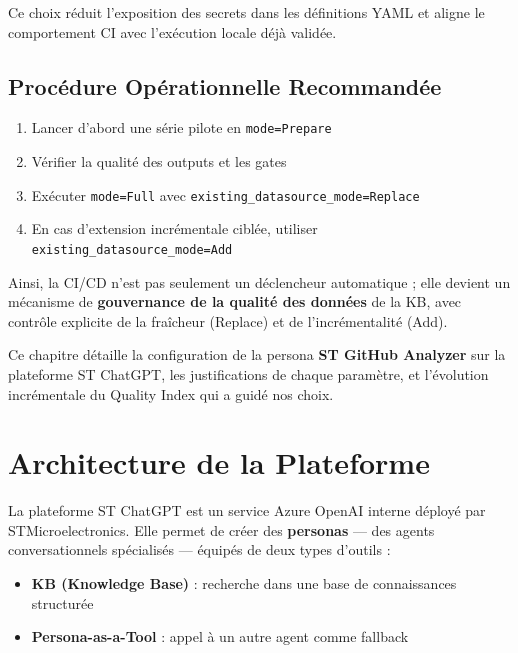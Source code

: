 \documentclass[12pt,a4paper]{report}
\begin{document}
Ce choix réduit l'exposition des secrets dans les définitions YAML et aligne le comportement CI avec l'exécution locale déjà validée.

\subsection{Procédure Opérationnelle Recommandée}

\begin{enumerate}
  \item Lancer d'abord une série pilote en \texttt{mode=Prepare}
  \item Vérifier la qualité des outputs et les gates
  \item Exécuter \texttt{mode=Full} avec \texttt{existing\_datasource\_mode=Replace}
  \item En cas d'extension incrémentale ciblée, utiliser \texttt{existing\_datasource\_mode=Add}
\end{enumerate}

Ainsi, la CI/CD n'est pas seulement un déclencheur automatique ; elle devient un mécanisme de \textbf{gouvernance de la qualité des données} de la KB, avec contrôle explicite de la fraîcheur (Replace) et de l'incrémentalité (Add).

\iffalse

Ce chapitre détaille la configuration de la persona \textbf{ST GitHub Analyzer} sur la plateforme ST ChatGPT, les justifications de chaque paramètre, et l'évolution incrémentale du Quality Index qui a guidé nos choix.

\section{Architecture de la Plateforme}

La plateforme ST ChatGPT est un service Azure OpenAI interne déployé par STMicroelectronics. Elle permet de créer des \textbf{personas} --- des agents conversationnels spécialisés --- équipés de deux types d'outils :

\begin{itemize}
  \item \textbf{KB (Knowledge Base)} : recherche dans une base de connaissances structurée
  \item \textbf{Persona-as-a-Tool} : appel à un autre agent comme fallback
\end{itemize}
\end{document}

